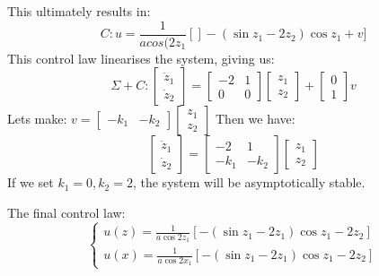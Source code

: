 {    This ultimately results in:
    \begin{equation}
        C : u = \frac{1}{acos(2z_1}[]-(\sin{z_1}-2z_2)\cos{z_1}+v]
    \end{equation}
   This control law linearises the system, giving us:
   \begin{equation}
       \Sigma +C : \begin{bmatrix}
           \dot{z}_1 \\\dot{z}_2
       \end{bmatrix}
       = \begin{bmatrix}
           -2 & 1 \\
           0 & 0
       \end{bmatrix}
       \begin{bmatrix}
           z_1 \\ z_2
       \end{bmatrix}
       + \begin{bmatrix}
           0 \\ 1
       \end{bmatrix}v
   \end{equation}
   Lets make: $v = \begin{bmatrix}
       -k_1 & -k_2 
   \end{bmatrix}
   \begin{bmatrix}
       z_1 \\ z_2
   \end{bmatrix}
   $
   Then we have:
   \begin{equation}
       \begin{bmatrix}
           \dot{z}_1 \\\dot{z}_2
       \end{bmatrix}
       = \begin{bmatrix}
           -2 & 1 \\
           -k_1& -k_2
       \end{bmatrix}
       \begin{bmatrix}
           z_1 \\ z_2
       \end{bmatrix}
   \end{equation}
    If we set $k_1=0, k_2=2$, the system will be asymptotically stable.

    The final control law:
    \begin{equation}
        \begin{cases}
            u(z) = \frac{1}{a\cos{2z_1}}[-(\sin{z_1}-2z_1)\cos{z_1}-2z_2]\\
            u(x) = \frac{1}{a\cos{2x_1}}[-(\sin{z_1}-2z_1)\cos{z_1}-2z_2]


        \end{cases}
        
    \end{equation}

}

